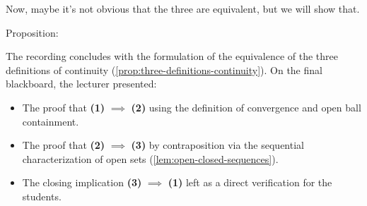 \begin{speech}[01:07:32 - 01:07:57]
Now, maybe it's not obvious that the three are equivalent, but we will show that.

Proposition: 
\end{speech}

\begin{content}
\end{content}

\begin{note}
The recording concludes with the formulation of the equivalence of the three definitions of continuity (\cref{prop:three-definitions-continuity}). On the final blackboard, the lecturer presented:
\begin{itemize}
    \item The proof that \textbf{(1)} $\implies$ \textbf{(2)} using the definition of convergence and open ball containment.
    \item The proof that \textbf{(2)} $\implies$ \textbf{(3)} by contraposition via the sequential characterization of open sets (\cref{lem:open-closed-sequences}).
    \item The closing implication \textbf{(3)} $\implies$ \textbf{(1)} left as a direct verification for the students.
\end{itemize}
\end{note}

